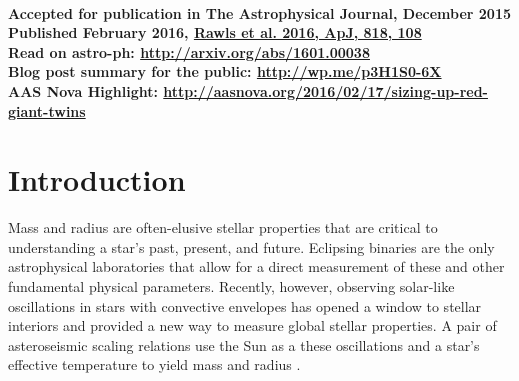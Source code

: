 \textbf{\\ Accepted for publication in The Astrophysical Journal, December 2015 \\ Published February 2016, \href{http://iopscience.iop.org/article/10.3847/0004-637X/818/2/108}{Rawls et al. 2016, ApJ, 818, 108} \\ Read on astro-ph: \url{http://arxiv.org/abs/1601.00038} \\ Blog post summary for the public: \url{http://wp.me/p3H1S0-6X} \\ AAS Nova Highlight: \url{http://aasnova.org/2016/02/17/sizing-up-red-giant-twins}} \\


\section{Introduction}\label{intro}


Mass and radius are often-elusive stellar properties that are critical to understanding a star's past, present, and future. Eclipsing binaries are the only astrophysical laboratories that allow for a direct measurement of these and other fundamental physical parameters. Recently, however, observing solar-like oscillations in stars with convective envelopes has opened a window to stellar interiors and provided a new way to measure global stellar properties. A pair of asteroseismic scaling relations use the Sun as a  these oscillations and a star's effective temperature to yield mass and radius \citep{kje95,hub10,mos13}.

